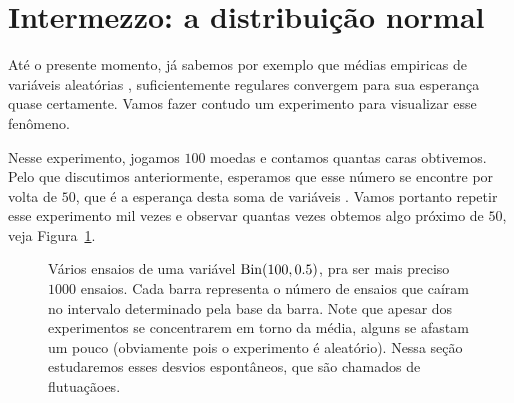 \newpage

\section*{Intermezzo: a distribuição normal}



Até o presente momento, já sabemos por exemplo que médias empiricas de variáveis aleatórias \iid, 
suficientemente regulares convergem para sua esperança quase certamente.
Vamos fazer contudo um experimento para visualizar esse fenômeno.

Nesse experimento, jogamos $100$ moedas e contamos quantas caras obtivemos.
Pelo que discutimos anteriormente, esperamos que esse número se encontre por volta de $50$, que é a esperança desta soma de variáveis \iid.
Vamos portanto repetir esse experimento mil vezes e observar quantas vezes obtemos algo próximo de $50$, veja Figura~\ref{f:histograma_normal}.

\begin{figure}[!ht]
  \centering
  \caption{Vários ensaios de uma variável $\operatorname{Bin}(100,0.5)$, pra ser mais preciso $1000$ ensaios. Cada barra representa o número de ensaios que caíram no intervalo determinado pela base da barra. Note que apesar dos experimentos se concentrarem em torno da média, alguns se afastam um pouco (obviamente pois o experimento é aleatório). Nessa seção estudaremos esses desvios espontâneos, que são chamados de flutuaçãoes. }
  \label{f:histograma_normal}
\end{figure}

